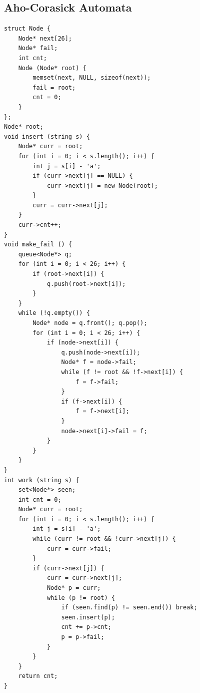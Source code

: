 \documentclass[10pt,letterpaper,landscape]{article}
\begin{document}
\begin{multicols}{2}
\subsection{Aho-Corasick Automata}
\begin{lstlisting}
struct Node {
	Node* next[26];
	Node* fail;
	int cnt;
	Node (Node* root) {
		memset(next, NULL, sizeof(next));
		fail = root;
		cnt = 0;
	}
};
Node* root;
void insert (string s) {
	Node* curr = root;
	for (int i = 0; i < s.length(); i++) {
		int j = s[i] - 'a';
		if (curr->next[j] == NULL) {
			curr->next[j] = new Node(root);
		}
		curr = curr->next[j];
	}
	curr->cnt++;
}
void make_fail () {
	queue<Node*> q;
	for (int i = 0; i < 26; i++) {
		if (root->next[i]) {
			q.push(root->next[i]);
		}
	}
	while (!q.empty()) {
		Node* node = q.front(); q.pop();
		for (int i = 0; i < 26; i++) {
			if (node->next[i]) {
				q.push(node->next[i]);
				Node* f = node->fail;
				while (f != root && !f->next[i]) {
					f = f->fail;
				}
				if (f->next[i]) {
					f = f->next[i];
				}
				node->next[i]->fail = f;
			}
		}
	}
}
int work (string s) {
	set<Node*> seen;
	int cnt = 0;
	Node* curr = root;
	for (int i = 0; i < s.length(); i++) {
		int j = s[i] - 'a';
		while (curr != root && !curr->next[j]) {
			curr = curr->fail;
		}
		if (curr->next[j]) {
			curr = curr->next[j];
			Node* p = curr;
			while (p != root) {
				if (seen.find(p) != seen.end()) break;
				seen.insert(p);
				cnt += p->cnt;
				p = p->fail;
			}
		}
	}
	return cnt;
}
\end{lstlisting}

\end{multicols}
\end{document}
